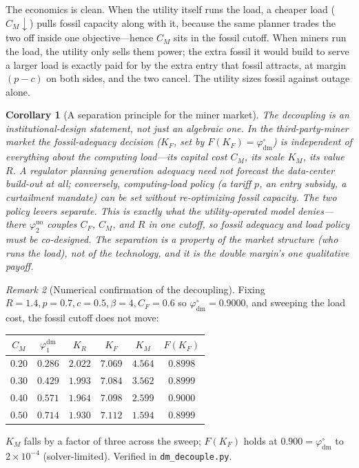 \documentclass[11pt,reqno]{amsart}
\theoremstyle{plain}\newtheorem{theorem}{Theorem}\newtheorem{proposition}[theorem]{Proposition}
\newtheorem{corollary}[theorem]{Corollary}
\theoremstyle{remark}\newtheorem{remark}[theorem]{Remark}\newtheorem{observation}[theorem]{Observation}
\newcommand{\KR}{K_R}\newcommand{\KF}{K_F}\newcommand{\KM}{K_M}
\newcommand{\CM}{C_M}\newcommand{\CF}{C_F}\newcommand{\CR}{C_R}
\newcommand{\phio}{\varphi^{\circ}}\newcommand{\FKR}{F_{\KR}}\newcommand{\Dbar}{\bar D}
\begin{document}
The economics is clean. When the utility itself runs the load, a cheaper load
($\CM\downarrow$) pulls fossil capacity along with it, because the same planner trades the two
off inside one objective---hence $\CM$ sits in the fossil cutoff. When miners run the load,
the utility only sells them power; the extra fossil it would build to serve a larger load is
exactly paid for by the extra entry that fossil attracts, at margin $(p-c)$ on both sides, and
the two cancel. The utility sizes fossil against outage alone.

\begin{corollary}[A separation principle for the miner market]\label{cor:separation}
The decoupling is an institutional-design statement, not just an algebraic one. In the
third-party-miner market the fossil-adequacy decision ($\KF$, set by
$F(\KF)=\phio_{\mathrm{dm}}$) is independent of everything about the computing load---its
capital cost $\CM$, its scale $\KM$, its value $R$. A regulator planning generation adequacy
need not forecast the data-center build-out at all; conversely, computing-load policy (a tariff
$p$, an entry subsidy, a curtailment mandate) can be set without re-optimizing fossil capacity.
The two policy levers \emph{separate}. This is exactly what the utility-operated model
denies---there $\varphi_2^{\mathrm{uo}}$ couples $\CF$, $\CM$, and $R$ in one cutoff, so fossil
adequacy and load policy must be co-designed. The separation is a property of the market
structure (who runs the load), not of the technology, and it is the double margin's one
qualitative payoff.
\end{corollary}

\begin{remark}[Numerical confirmation of the decoupling]\label{rem:decouplenum}
Fixing $R=1.4,p=0.7,c=0.5,\beta=4,\CF=0.6$ so $\phio_{\mathrm{dm}}=0.9000$, and sweeping the
load cost, the fossil cutoff does not move:
\begin{center}\small
\begin{tabular}{cccccc}
\toprule
$\CM$ & $\varphi_1^{\mathrm{dm}}$ & $\KR$ & $\KF$ & $\KM$ & $F(\KF)$\\
\midrule
$0.20$ & $0.286$ & $2.022$ & $7.069$ & $4.564$ & $0.8998$\\
$0.30$ & $0.429$ & $1.993$ & $7.084$ & $3.562$ & $0.8999$\\
$0.40$ & $0.571$ & $1.964$ & $7.098$ & $2.599$ & $0.9000$\\
$0.50$ & $0.714$ & $1.930$ & $7.112$ & $1.594$ & $0.8999$\\
\bottomrule
\end{tabular}
\end{center}
$\KM$ falls by a factor of three across the sweep; $F(\KF)$ holds at $0.900=\phio_{\mathrm{dm}}$
to $2\times10^{-4}$ (solver-limited). Verified in \texttt{dm\_decouple.py}.
\end{remark}
\end{document}
